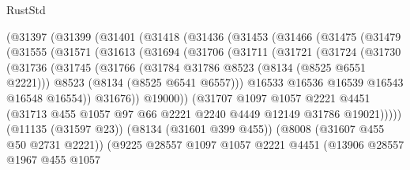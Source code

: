 \begin{lexlean}{RustStd}
\begin{coremodule}
      (@31397
        (@31399
          (@31401
            (@31418
              (@31436
                (@31453
                  (@31466
                    (@31475
                      (@31479
                        (@31555
                          (@31571
                            (@31613
                              (@31694
                                (@31706
                                  (@31711
                                    (@31721
                                      (@31724
                                        (@31730
                                          (@31736
                                            (@31745
                                              (@31766
                                                (@31784 @31786 @8523 (@8134 (@8525 @6551 @2221)))
                                                @8523
                                                (@8134 (@8525 @6541 @6557)))
                                              @16533
                                              @16536
                                              @16539
                                              @16543
                                              @16548
                                              @16554))
                                          @31676))
                                      @19000))
                                  (@31707
                                    @1097
                                    @1057
                                    @2221
                                    @4451
                                    (@31713
                                      @455
                                      @1057
                                      @97
                                      @66
                                      @2221
                                      @2240
                                      @4449
                                      @12149
                                      @31786
                                      @19021)))))
                            (@11135 (@31597 @23))
                            (@8134 (@31601 @399 @455))
                            (@8008 (@31607 @455 @50 @2731 @2221))
                            (@9225
                              @28557
                              @1097
                              @1057
                              @2221
                              @4451
                              (@13906
                                @28557
                                @1967
                                @455
                                @1057

\end{coremodule}
\end{lexlean}
